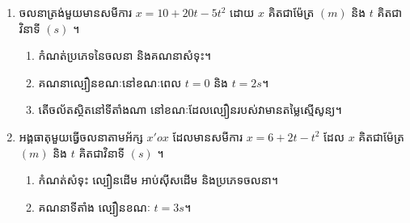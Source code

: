 \begin{enumerate}
\begin{figure}[H]
	\end{figure}
	\item ចលនាត្រង់មួយមានសមីការ $x=10+20t-5t^{2}$ ដោយ $x$ គិតជាម៉ែត្រ $\left(m\right)$ និង $t$ គិតជាវិនាទី $\left(s\right)$ ។
	\begin{enumerate}
		\item កំណត់ប្រភេទនៃចលនា និងគណនាសំទុះ។
		\item គណនាល្បឿនខណៈនៅខណៈពេល $t=0$ និង $t=2s$។
		\item តើចល័តស្ថិតនៅទីតាំងណា នៅខណៈដែលល្បឿនរបស់វាមានតម្លៃស្មើសូន្យ។
	\end{enumerate}
	\item អង្គធាតុមួយធ្វើចលនាតាមអ័ក្ស $x'ox$ ដែលមានសមីការ $x=6+2t-t^{2}$ ដែល $x$ គិតជាម៉ែត្រ $\left(m\right)$ និង $t$ គិតជាវិនាទី $\left(s\right)$ ។
	\begin{enumerate}
		\item កំណត់សំទុះ ល្បឿនដើម អាប់ស៊ីសដើម និងប្រភេទចលនា។
		\item គណនាទីតាំង ល្បឿនខណៈ $t=3s$។
	\end{enumerate}
\end{enumerate}